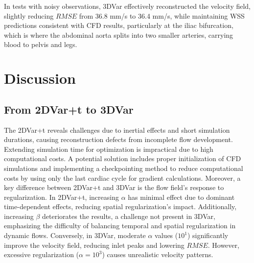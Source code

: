 In tests with noisy observations, 3DVar effectively reconstructed the velocity field, slightly reducing \(RMSE\) from 36.8 mm/s to 36.4 mm/s, while maintaining WSS predictions consistent with CFD results, particularly at the iliac bifurcation, which is where the abdominal aorta splits into two smaller arteries, carrying blood to pelvis and legs.




\section*{Discussion}


\subsection*{From 2DVar+t to 3DVar}
The 2DVar+t reveals challenges due to inertial effects and short simulation durations, causing reconstruction defects from incomplete flow development. Extending simulation time for optimization is impractical due to high computational costs. A potential solution includes proper initialization of CFD simulations and implementing a checkpointing method to reduce computational costs by using only the last cardiac cycle for gradient calculations.
Moreover, a key difference between 2DVar+t and 3DVar is the flow field's response to regularization. In 2DVar+t, increasing $\alpha$ has minimal effect due to dominant time-dependent effects, reducing spatial regularization's impact. Additionally, increasing $\beta$ deteriorates the results, a challenge not present in 3DVar, emphasizing the difficulty of balancing temporal and spatial regularization in dynamic flows. Conversely, in 3DVar, moderate $\alpha$ values ($10^{1}$) significantly improve the velocity field, reducing inlet peaks and lowering \(RMSE\). However, excessive regularization ($\alpha = 10^{3}$) causes unrealistic velocity patterns. 

